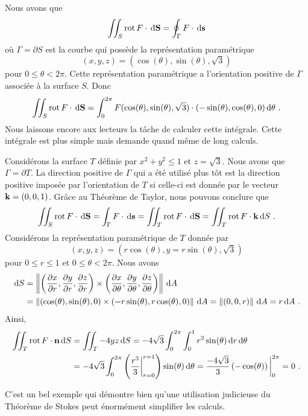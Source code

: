 {\begin{egg}
Nous avons que
\[
  \iint_S \operatorname{rot}  F \cdot \,\mathrm{d}\mathbf{S}
  = \oint_\Gamma F \cdot \,\mathrm{d}\mathbf{s}
\]
où $\Gamma = \partial S$ est la courbe qui possède la
représentation paramétrique 
\[
(x,y,z) = (\cos(\theta), \sin(\theta), \sqrt{3})
\]
pour $0 \leq \theta < 2\pi$.   Cette représentation paramétrique a
l'orientation positive de $\Gamma$ associée à la surface $S$.  Donc
\[
  \iint_S \operatorname{rot}  F \cdot \,\mathrm{d}\mathbf{S}
  = \int_0^{2\pi} F(\cos(\theta),\sin(\theta),\sqrt{3}) \cdot
  (-\sin(\theta), \cos(\theta) , 0 ) \,\mathrm{d}\theta \ .
\]
Nous laissons encore aux lecteurs la tâche de calculer cette intégrale.
Cette intégrale est plus simple mais demande quand même de long
calculs.

Considérons la surface $T$ définie par $x^2 + y^2 \leq 1$ et
$z = \sqrt{3}$.  Nous avons que $\Gamma = \partial T$.  La direction
positive de $\Gamma$ qui a été utilisé plus tôt est la direction
positive imposée par l'orientation de $T$ si celle-ci est donnée par
le vecteur $\mathbf{k} = (0,0,1)$.  Grâce au Théorème de Taylor, nous
pouvons conclure que
\[
  \iint_S \operatorname{rot}  F \cdot \,\mathrm{d}\mathbf{S}
= \int_\Gamma F \cdot \,\mathrm{d}\mathbf{s}
= \iint_T \operatorname{rot}  F \cdot \,\mathrm{d}\mathbf{S}
= \iint_T \operatorname{rot}  F \cdot \mathbf{k} \,\mathrm{d}S \ .
\]
Considérons la représentation paramétrique de $T$ donnée par
\[
(x,y,z) = (r \cos(\theta), y = r\sin(\theta), \sqrt{3})
\]
pour $0 \leq r \leq 1$ et $0 \leq \theta < 2\pi$.  Nous avons
\begin{align*}
\,\mathrm{d}S &= \left\| \left( \frac{\partial x}{\partial r} , \frac{\partial y}{\partial r} , \frac{\partial z}{\partial r} \right)
\times
\left( \frac{\partial x}{\partial \theta} , \frac{\partial y}{\partial \theta} , \frac{\partial z}{\partial \theta} \right) 
\right\| \,\mathrm{d}A \\
&= \left\| \left(\cos(\theta) , \sin(\theta) , 0 \right)
\times
\left( -r\sin(\theta) , r \cos(\theta) , 0 \right) \right\| \,\mathrm{d}A
= \left\| (0 , 0 , r ) \right\| \,\mathrm{d}A = r \,\mathrm{d}A \ .
\end{align*}
Ainsi, 
\begin{align*}
\iint_T \operatorname{rot}  F \cdot \mathbf{n} \,\mathrm{d}S &= \iint_T -4yz \,\mathrm{d}S =
-4\sqrt{3} \int_0^{2\pi} \int_0^1 r^2\sin(\theta) \,\mathrm{d}r\,\mathrm{d}\theta \\
&=  -4\sqrt{3} \int_0^{2\pi} \left( \frac{r^3}{3}\bigg|_{r=0}^{r=1}\right)
\sin(\theta) \,\mathrm{d}\theta
= \frac{-4\sqrt{3}}{3} \left( -\cos(\theta) \right)\bigg|_0^{2\pi}
= 0 \ .
\end{align*}

C'est un bel exemple qui démontre bien qu'une utilisation judicieuse
du Théorème de Stokes peut énormément simplifier les calculs.
\end{egg}

}
